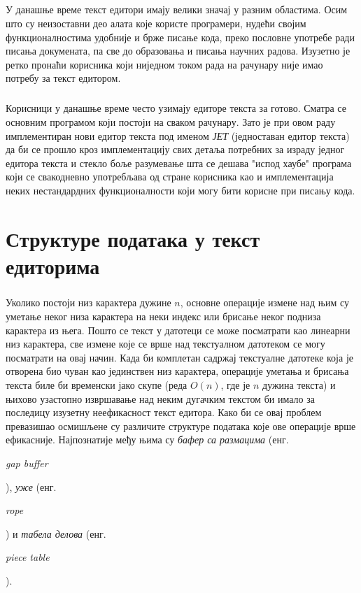 \documentclass[12pt,oneside]{memoir}
\begin{document}
\paragraph{}
У данашње време текст едитори имају велики значај у разним областима.
Осим што су неизоставни део алата које користе програмери, нудећи својим
функционалностима удобније и брже писање кода, преко пословне употребе ради
писања докумената, па све до образовања и писања научних радова. Изузетно је ретко пронаћи корисника који ниједном током рада на рачунару није
имао потребу за текст едитором.

\paragraph{}
Корисници у данашње време често узимају едиторе текста за готово. Сматра се основним 
програмом који постоји на сваком рачунару. Зато је при овом раду имплементиран нови
едитор текста под именом \emph{ЈЕТ} (једноставан едитор текста) да би се прошло кроз имплементацију свих детаља потребних за израду 
једног едитора текста и стекло боље разумевање шта се дешава "испод хаубе" програма
који се свакодневно употребљава од стране корисника као и имплементација неких 
нестандардних функционалности који могу бити корисне при писању кода.

\chapter{Структуре података у текст едиторима}
\paragraph{}
Уколико постоји низ карактера дужине \(n\), основне операције измене над њим су 
уметање неког низа карактера на неки индекс или брисање неког подниза карактера из њега.
Пошто се текст у датотеци се може посматрати као линеарни низ карактера, све измене које
се врше над текстуалном датотеком се могу посматрати на овај начин. 
Када би комплетан садржај текстуалне датотеке која је отворена био чуван као јединствен
низ карактера, операције уметања и брисања текста биле би временски јако скупе (реда
\(O(n)\), где је \(n\) дужина текста) и њихово узастопно извршавање над неким дугачким
текстом би имало за последицу изузетну неефикасност текст едитора. Како би се овај 
проблем превазишао осмишљене су различите структуре података које ове операције
врше ефикасније. Најпознатије међу њима су \emph{бафер са размацима}
(енг. \begin{latinica}\textit{gap buffer}\end{latinica}), \emph{уже} (енг. 
\begin{latinica}\textit{rope}\end{latinica}) и \emph{табела делова} (енг. 
\begin{latinica}\textit{piece table}\end{latinica}).
\end{document}
